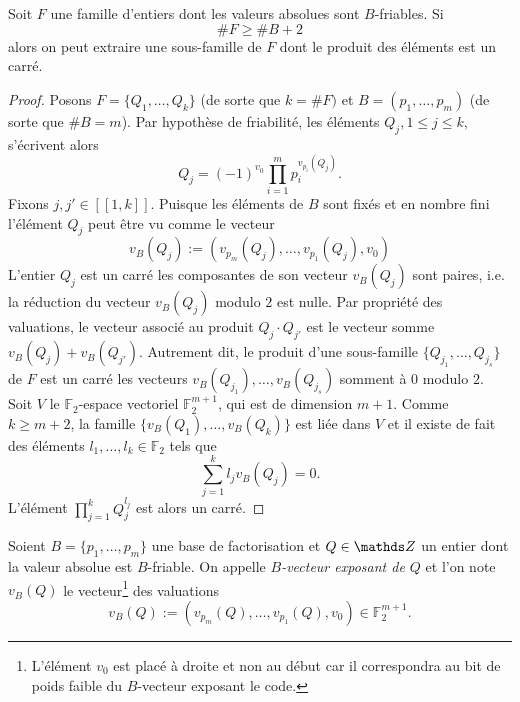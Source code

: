 \begin{proposition}
	Soit $F$ une famille d'entiers dont les valeurs absolues sont $B$-friables.
	Si \[\# F \geqslant \# B + 2\] alors on peut extraire une sous-famille de
	$F$ dont le produit des éléments est un carré.
\end{proposition}

\begin{proof}
	Posons $F = \{Q_1, \dots, Q_k\}$ (de sorte que $k = \# F)$ et $B = (p_1,
	\dots, p_m)$ (de sorte que $\# B = m$). Par hypothèse de friabilité, les
	éléments $Q_j, 1\leqslant j \leqslant k$, s'écrivent alors \[Q_j
	= (-1)^{v_0}\prod_{i=1}^m p_i^{v_{p_i}(Q_j)}.\] Fixons $j, j'\in [\![1,
	k]\!]$. Puisque les éléments de $B$ sont fixés et en nombre fini l'élément
	$Q_j$ peut être vu comme le vecteur \[v_B(Q_j) := (v_{p_m}(Q_j), \dots,
	v_{p_1}(Q_j), v_0 )\] L'entier $Q_j$ est un carré \ssi les composantes de
	son vecteur $v_B(Q_j)$ sont paires, i.e. la réduction du vecteur $v_B(Q_j)$
	modulo $2$ est nulle. Par propriété des valuations, le vecteur associé au
	produit $Q_j\cdot Q_{j'}$ est le vecteur somme $v_B(Q_j) + v_B(Q_{j'})$.
	Autrement dit, le produit d'une sous-famille $\{Q_{j_1}, \dots, Q_{j_s}\}$
	de $F$ est un carré \ssi les vecteurs $v_B(Q_{j_1}), \dots, v_B(Q_{j_s})$
	somment à $0$ modulo $2$. Soit $V$ le $\mathbb{F}_2$-espace vectoriel
	$\mathbb{F}_2^{m+1}$, qui est de dimension $m+1$. Comme $k\geqslant m+2$,
	la famille $\{v_B(Q_1), \dots, v_B(Q_k)\}$ est liée dans $V$ et il existe
	de fait des éléments $l_1,\dots, l_k\in \mathbb{F}_2$ tels que
	\[\sum_{j=1}^k l_j v_B(Q_j) = 0.\] L'élément $\prod_{j=1}^k Q_j^{l_j}$ est
	alors un carré.
\end{proof}

\begin{definition}
	Soient $B = \{p_1,\dots, p_m \}$ une base de factorisation et $Q\in \Z$ un
	entier dont la valeur absolue est $B$-friable. On appelle \emph{$B$-vecteur
	exposant de $Q$} et l'on note $v_B(Q)$ le vecteur\footnote{L'élément $v_0$
	est placé à droite et non au début car il correspondra au bit de poids
	faible du $B$-vecteur exposant le code.} des valuations \[v_B(Q) :=
	(v_{p_m}(Q), \dots, v_{p_1}(Q), v_0 ) \in \mathbb{F}_2^{m+1}.\] 
\end{definition}

